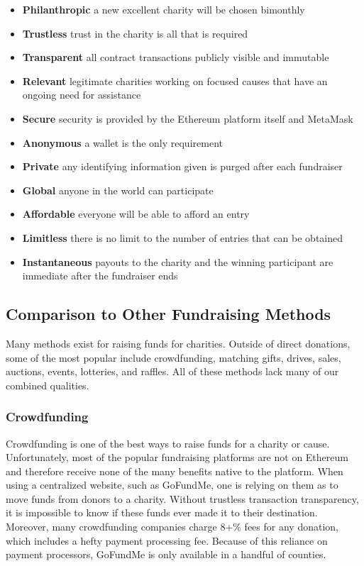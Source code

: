 \documentclass[11pt]{article}
\begin{document}
\begin{itemize}
\item{\textbf{Philanthropic} a new excellent charity will be chosen bimonthly}
\item{\textbf{Trustless} trust in the charity is all that is required}
\item{\textbf{Transparent} all contract transactions publicly visible and immutable}
\item{\textbf{Relevant} legitimate charities working on focused causes that have an ongoing need for assistance }
\item{\textbf{Secure} security is provided by the Ethereum platform itself and MetaMask}
\item{\textbf{Anonymous} a wallet is the only requirement}
\item{\textbf{Private} any identifying information given is purged after each fundraiser}
\item{\textbf{Global} anyone in the world can participate}
\item{\textbf{Affordable} everyone will be able to afford an entry}
\item{\textbf{Limitless} there is no limit to the number of entries that can be obtained}
\item{\textbf{Instantaneous} payouts to the charity and the winning participant are immediate after the fundraiser ends}
\end{itemize}

\subsection{Comparison to Other Fundraising Methods}

Many methods exist for raising funds for charities. Outside of direct donations, some of the most popular include crowdfunding, matching gifts, drives, sales, auctions, events, lotteries, and raffles. All of these methods lack many of our combined qualities.

\subsubsection{Crowdfunding}

Crowdfunding is one of the best ways to raise funds for a charity or cause. Unfortunately, most of the popular fundraising platforms are not on Ethereum and therefore receive none of the many benefits native to the platform. When using a centralized website, such as GoFundMe, one is relying on them as to move funds from donors to a charity. Without trustless transaction transparency, it is impossible to know if these funds ever made it to their destination. Moreover, many crowdfunding companies charge 8+\% fees for any donation, which includes a hefty payment processing fee. Because of this reliance on payment processors, GoFundMe is only available in a handful of counties.
\end{document}
